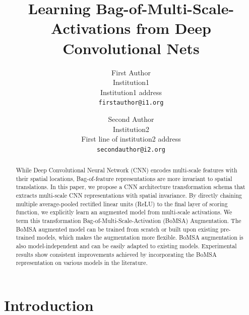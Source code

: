 \documentclass[10pt,twocolumn,letterpaper]{article}
\begin{document}
\title{Learning Bag-of-Multi-Scale-Activations from Deep Convolutional Nets}

\author{First Author\\
Institution1\\
Institution1 address\\
{\tt\small firstauthor@i1.org}
\and
Second Author\\
Institution2\\
First line of institution2 address\\
{\tt\small secondauthor@i2.org}
}

\maketitle

\begin{abstract}
While Deep Convolutional Neural Network (CNN) encodes multi-scale features with their spatial locations, Bag-of-feature representations are more invariant to spatial translations. In this paper, we propose a CNN architecture transformation schema that extracts multi-scale CNN representations with spatial invariance. By directly chaining multiple average-pooled rectified linear units (ReLU) to the final layer of scoring function, we explicitly learn an augmented model from multi-scale activations. We term this transformation Bag-of-Multi-Scale-Activation (BoMSA) Augmentation. The BoMSA augmented model can be trained from scratch or built upon existing pre-trained models, which makes the augmentation more flexible. BoMSA augmentation is also model-independent and can be easily adapted to existing models. Experimental results show consistent improvements achieved by incorporating the BoMSA representation on various models in the literature.  

\end{abstract}

\section{Introduction}
\end{document}
